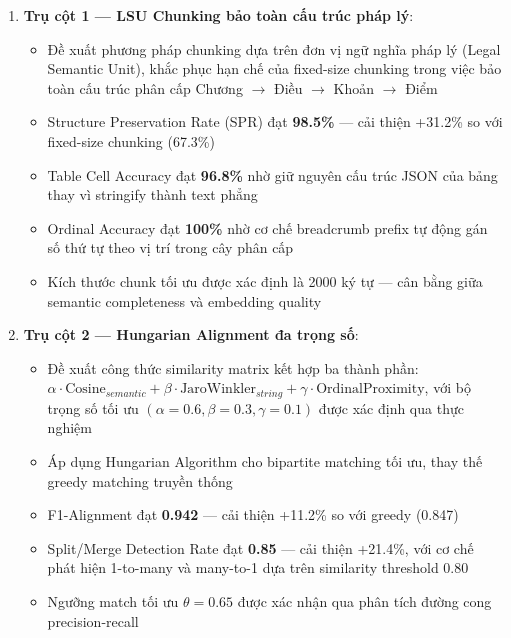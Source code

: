\begin{enumerate}[label=\textbf{(\arabic*)}]

    \item \textbf{Trụ cột 1 — LSU Chunking bảo toàn cấu trúc pháp lý}:
    \begin{itemize}
        \item Đề xuất phương pháp chunking dựa trên đơn vị ngữ nghĩa pháp lý (Legal Semantic Unit), khắc phục hạn chế của fixed-size chunking trong việc bảo toàn cấu trúc phân cấp Chương $\rightarrow$ Điều $\rightarrow$ Khoản $\rightarrow$ Điểm
        \item Structure Preservation Rate (SPR) đạt \textbf{98.5\%} — cải thiện +31.2\% so với fixed-size chunking (67.3\%)
        \item Table Cell Accuracy đạt \textbf{96.8\%} nhờ giữ nguyên cấu trúc JSON của bảng thay vì stringify thành text phẳng
        \item Ordinal Accuracy đạt \textbf{100\%} nhờ cơ chế breadcrumb prefix tự động gán số thứ tự theo vị trí trong cây phân cấp
        \item Kích thước chunk tối ưu được xác định là 2000 ký tự — cân bằng giữa semantic completeness và embedding quality
    \end{itemize}

    \item \textbf{Trụ cột 2 — Hungarian Alignment đa trọng số}:
    \begin{itemize}
        \item Đề xuất công thức similarity matrix kết hợp ba thành phần: $\alpha \cdot \text{Cosine}_{semantic} + \beta \cdot \text{JaroWinkler}_{string} + \gamma \cdot \text{OrdinalProximity}$, với bộ trọng số tối ưu $(\alpha=0.6, \beta=0.3, \gamma=0.1)$ được xác định qua thực nghiệm
        \item Áp dụng Hungarian Algorithm cho bipartite matching tối ưu, thay thế greedy matching truyền thống
        \item F1-Alignment đạt \textbf{0.942} — cải thiện +11.2\% so với greedy (0.847)
        \item Split/Merge Detection Rate đạt \textbf{0.85} — cải thiện +21.4\%, với cơ chế phát hiện 1-to-many và many-to-1 dựa trên similarity threshold 0.80
        \item Ngưỡng match tối ưu $\theta = 0.65$ được xác nhận qua phân tích đường cong precision-recall
    \end{itemize}


\end{enumerate}
